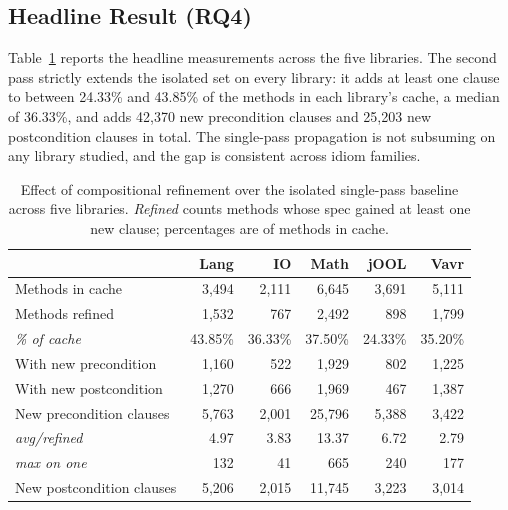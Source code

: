\subsection{Headline Result (RQ4)}

Table~\ref{tab:comp-headline} reports the headline measurements across the five
libraries. The second pass strictly extends the isolated set on every library:
it adds at least one clause to between 24.33\% and 43.85\% of the methods in each
library's cache, a median of 36.33\%, and adds 42{,}370 new precondition clauses
and 25{,}203 new postcondition clauses in total. The single-pass propagation is
not subsuming on any library studied, and the gap is consistent across idiom
families.

\begin{table}[ht]
\centering
\small
\caption{Effect of compositional refinement over the isolated single-pass
baseline across five libraries. \emph{Refined} counts methods whose spec gained
at least one new clause; percentages are of methods in cache.}
\label{tab:comp-headline}
\begin{tabular}{lrrrrr}
\toprule
& \textbf{Lang} & \textbf{IO} & \textbf{Math} & \textbf{jOOL} & \textbf{Vavr} \\
\midrule
Methods in cache             & 3{,}494 & 2{,}111 & 6{,}645 & 3{,}691 & 5{,}111 \\
\midrule
Methods refined              & 1{,}532 & 767     & 2{,}492 & 898     & 1{,}799 \\
\hspace{1em}\emph{\% of cache} & 43.85\% & 36.33\% & 37.50\% & 24.33\% & 35.20\% \\
With new precondition & 1{,}160 & 522    & 1{,}929 & 802     & 1{,}225 \\
With new postcondition & 1{,}270 & 666   & 1{,}969 & 467     & 1{,}387 \\
\midrule
New precondition clauses     & 5{,}763  & 2{,}001 & 25{,}796 & 5{,}388 & 3{,}422 \\
\hspace{1em}\emph{avg/refined} & 4.97 & 3.83 & 13.37 & 6.72 & 2.79 \\
\hspace{1em}\emph{max on one} & 132   & 41 & 665 & 240 & 177 \\
New postcondition clauses    & 5{,}206  & 2{,}015 & 11{,}745 & 3{,}223 & 3{,}014 \\
\bottomrule
\end{tabular}
\end{table}

